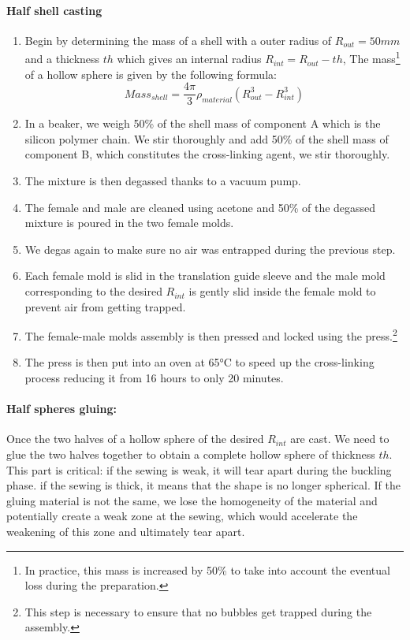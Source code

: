 \paragraph{Half shell casting}
\begin{enumerate}
	\item Begin by determining the mass of a shell with a outer radius of $R_{out}= 50 mm$ and a thickness $th$ which gives an internal radius $R_{int} = R_{out}-th$, The mass\footnote{In practice, this mass is increased by 50\% to take into account the eventual loss during the preparation.} of a hollow sphere is given by the following formula:
		\[Mass_{shell} = \frac{4\pi}{3}\rho_{material} (R_{out}^3-R_{int}^3) \]

	\item In a beaker, we weigh 50\% of the shell mass of component A which is the silicon polymer chain. We stir thoroughly and add 50\% of the shell mass of component B, which constitutes the cross-linking agent, we stir thoroughly.
	\item The mixture is then degassed thanks to a vacuum pump.
	\item The female and male are cleaned using acetone and 50\% of the degassed mixture is poured in the two female molds.
	\item We degas again to make sure no air was entrapped during the previous step.
	\item Each female mold is slid in the translation guide sleeve and the male mold corresponding to the desired $R_{int}$ is gently slid inside the female mold to prevent air from getting trapped.
	\item The female-male molds assembly is then pressed and locked using the press.\footnote{This step is necessary to ensure that no bubbles get trapped during the assembly.}
	\item The press is then put into an oven at 65°C to speed up the cross-linking process reducing it from 16 hours to only 20 minutes.
	
\end{enumerate}

\paragraph{Half spheres gluing:}
Once the two halves of a hollow sphere of the desired $R_{int}$ are cast. We need to glue the two halves together to obtain a complete hollow sphere of thickness $th$.
This part is critical: if the sewing is weak, it will tear apart during the buckling phase. if the sewing is thick, it means that the shape is no longer spherical. If the gluing material is not the same, we lose the homogeneity of the material and potentially create a weak zone at the sewing, which would accelerate the weakening of this zone and ultimately tear apart.
